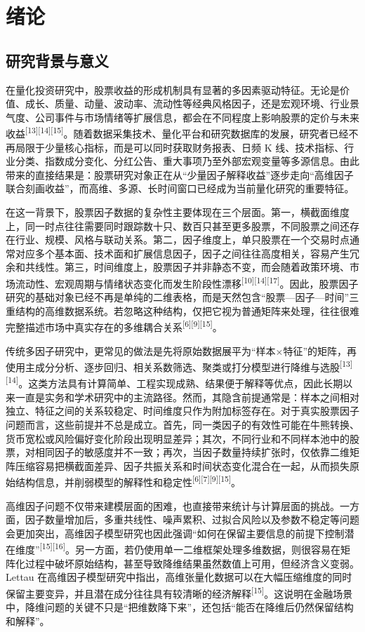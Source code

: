 \chapter{绪论}

\section{研究背景与意义}

在量化投资研究中，股票收益的形成机制具有显著的多因素驱动特征。无论是价值、成长、质量、动量、波动率、流动性等经典风格因子，还是宏观环境、行业景气度、公司事件与市场情绪等扩展信息，都会在不同程度上影响股票的定价与未来收益\textsuperscript{[13][14][15]}。随着数据采集技术、量化平台和研究数据库的发展，研究者已经不再局限于少量核心指标，而是可以同时获取财务报表、日频 K 线、技术指标、行业分类、指数成分变化、分红公告、重大事项乃至外部宏观变量等多源信息。由此带来的直接结果是：股票研究对象正在从“少量因子解释收益”逐步走向“高维因子联合刻画收益”，而高维、多源、长时间窗口已经成为当前量化研究的重要特征。

在这一背景下，股票因子数据的复杂性主要体现在三个层面。第一，横截面维度上，同一时点往往需要同时跟踪数十只、数百只甚至更多股票，不同股票之间还存在行业、规模、风格与联动关系。第二，因子维度上，单只股票在一个交易时点通常对应多个基本面、技术面和扩展信息因子，因子之间往往高度相关，容易产生冗余和共线性。第三，时间维度上，股票因子并非静态不变，而会随着政策环境、市场流动性、宏观周期与情绪状态变化而发生阶段性漂移\textsuperscript{[10][14][17]}。因此，股票因子研究的基础对象已经不再是单纯的二维表格，而是天然包含“股票—因子—时间”三重结构的高维数据系统。若忽略这种结构，仅把它视为普通矩阵来处理，往往很难完整描述市场中真实存在的多维耦合关系\textsuperscript{[6][9][15]}。

传统多因子研究中，更常见的做法是先将原始数据展平为“样本$\times$特征”的矩阵，再使用主成分分析、逐步回归、相关系数筛选、聚类或打分模型进行降维与选股\textsuperscript{[13][14]}。这类方法具有计算简单、工程实现成熟、结果便于解释等优点，因此长期以来一直是实务和学术研究中的主流路径。然而，其隐含前提通常是：样本之间相对独立、特征之间的关系较稳定、时间维度只作为附加标签存在。对于真实股票因子问题而言，这些前提并不总是成立。首先，同一类因子的有效性可能在牛熊转换、货币宽松或风险偏好变化阶段出现明显差异；其次，不同行业和不同样本池中的股票，对相同因子的敏感度并不一致；再次，当因子数量持续扩张时，仅依靠二维矩阵压缩容易把横截面差异、因子共振关系和时间状态变化混合在一起，从而损失原始结构信息，并削弱模型的解释性和稳定性\textsuperscript{[6][7][9][15]}。

高维因子问题不仅带来建模层面的困难，也直接带来统计与计算层面的挑战。一方面，因子数量增加后，多重共线性、噪声累积、过拟合风险以及参数不稳定等问题会更加突出，高维因子模型研究也因此强调“如何在保留主要信息的前提下控制潜在维度”\textsuperscript{[15][16]}。另一方面，若仍使用单一二维框架处理多维数据，则很容易在矩阵化过程中破坏原始结构，甚至导致降维结果虽然数值上可用，但经济含义变弱。Lettau 在高维因子模型研究中指出，高维张量化数据可以在大幅压缩维度的同时保留主要变异，并且潜在成分往往具有较清晰的经济解释\textsuperscript{[15]}。这说明在金融场景中，降维问题的关键不只是“把维数降下来”，还包括“能否在降维后仍然保留结构和解释”。


